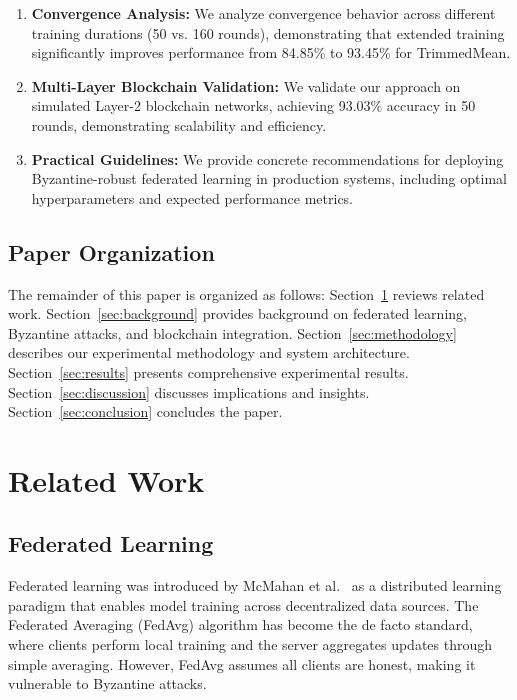 \documentclass[12pt,a4paper,onecolumn]{article}
\begin{document}
\begin{enumerate}
    \item \textbf{Convergence Analysis:} We analyze convergence behavior across different training durations (50 vs. 160 rounds), demonstrating that extended training significantly improves performance from 84.85\% to 93.45\% for TrimmedMean.
    
    \item \textbf{Multi-Layer Blockchain Validation:} We validate our approach on simulated Layer-2 blockchain networks, achieving 93.03\% accuracy in 50 rounds, demonstrating scalability and efficiency.
    
    \item \textbf{Practical Guidelines:} We provide concrete recommendations for deploying Byzantine-robust federated learning in production systems, including optimal hyperparameters and expected performance metrics.
\end{enumerate}

\subsection{Paper Organization}

The remainder of this paper is organized as follows: Section~\ref{sec:related} reviews related work. Section~\ref{sec:background} provides background on federated learning, Byzantine attacks, and blockchain integration. Section~\ref{sec:methodology} describes our experimental methodology and system architecture. Section~\ref{sec:results} presents comprehensive experimental results. Section~\ref{sec:discussion} discusses implications and insights. Section~\ref{sec:conclusion} concludes the paper.

\section{Related Work}
\label{sec:related}

\subsection{Federated Learning}

Federated learning was introduced by McMahan et al.~\cite{mcmahan2017communication} as a distributed learning paradigm that enables model training across decentralized data sources. The Federated Averaging (FedAvg) algorithm has become the de facto standard, where clients perform local training and the server aggregates updates through simple averaging. However, FedAvg assumes all clients are honest, making it vulnerable to Byzantine attacks.
\end{document}
